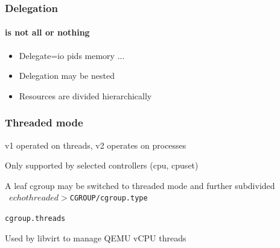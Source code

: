 \documentclass[serif]{beamer}
\begin{document}
\begin{frame}
  \frametitle{Delegation}
  \framesubtitle{is not all or nothing}

  \begin{itemize}
  \item Delegate=io pids memory ...
  \item Delegation may be nested
  \item Resources are divided hierarchically
  \end{itemize}
\end{frame}

\begin{frame}[fragile]
  \frametitle{Threaded mode}

  \pause

  v1 operated on threads, v2 operates on processes
  \medskip\pause

  Only supported by selected controllers (cpu, cpuset)
  \medskip\pause

  A leaf cgroup may be switched to threaded mode and further subdivided\\
  \texttt{        $ echo threaded > $CGROUP/cgroup.type}\\
  \pause

  \texttt{cgroup.threads}
  \medskip\pause

  Used by libvirt to manage QEMU vCPU threads
\end{frame}
\end{document}
